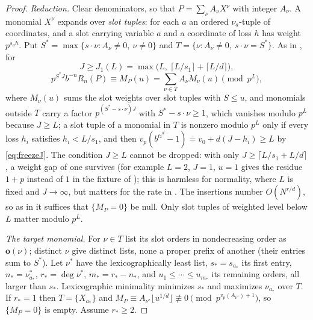 \documentclass[11pt]{article}
\begin{document}
\begin{proof}
\emph{Reduction.} Clear denominators, so that $P=\sum_\nu A_\nu X^\nu$ with integer $A_\nu$. A monomial
$X^\nu$ expands over \emph{slot tuples}: for each $a$ an ordered $\nu_a$-tuple of coordinates, and a slot
carrying variable $a$ and a coordinate of loss $h$ has weight $p^{s_ah}$. Put
$S^*=\max\{s\cdot\nu:A_\nu\ne0,\ \nu\ne0\}$ and $T=\{\nu:A_\nu\ne0,\ s\cdot\nu=S^*\}$. As in
, for
\begin{equation}\label{eq:freezeJ}
J\ge J_1(L)=\max\bigl(L,\ \lceil L/s_1\rceil+\lceil L/d\rceil\bigr),
\end{equation}
\[
p^{S^*J}b^{-n}R_n(P)\equiv M_P(u)=\sum_{\nu\in T}A_\nu M_\nu(u)\pmod{p^L},
\]
where $M_\nu(u)$ sums the slot weights over slot tuples with $S\le u$, and monomials outside $T$ carry a
factor $p^{(S^*-s\cdot\nu)J}$ with $S^*-s\cdot\nu\ge1$, which vanishes modulo $p^L$ because $J\ge L$; a
slot tuple of a monomial in $T$ is nonzero modulo $p^L$ only if every loss $h_i$ satisfies $h_i<L/s_1$, and
then $v_p(b^{ti^d}-1)=v_0+d(J-h_i)\ge L$ by \eqref{eq:freezeJ}. The condition $J\ge L$ cannot be dropped:
with only $J\ge\lceil L/s_1+L/d\rceil$, a weight gap of one survives (for example $L=2$, $J=1$, $u=1$ gives
the residue $1+p$ instead of $1$ in the fixture of ); this is harmless for normality,
where $L$ is fixed and $J\to\infty$, but matters for the rate in . The insertions number $O(N^{r/d})$, so as in  it suffices that
$\{M_P=0\}$ be null. Only slot tuples of weighted level below $L$ matter modulo $p^L$.

\emph{The target monomial.} For $\nu\in T$ list its slot orders in nondecreasing order as
$\mathbf o(\nu)$; distinct $\nu$ give distinct lists, none a proper prefix of another (their entries sum
to $S^*$). Let $\nu^*$ have the lexicographically least list, $s_*=s_{a_*}$ its first entry,
$n_*=\nu^*_{a_*}$, $r_*=\deg\nu^*$, $m_*=r_*-n_*$, and $u_1\le\cdots\le u_{m_*}$ its remaining orders, all
larger than $s_*$. Lexicographic minimality minimizes $s_*$ and maximizes $\nu_{a_*}$ over $T$. If
$r_*=1$ then $T=\{X_{a_*}\}$ and $M_P\equiv A_{\nu^*}\lfloor u^{1/d}\rfloor\not\equiv0\pmod{p^{v_p(A_{\nu^*})+1}}$, so
$\{M_P=0\}$ is empty. Assume $r_*\ge2$.


\end{proof}
\end{document}
